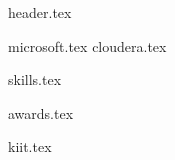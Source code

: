 \documentclass[11pt]{article}
\begin{document}
{header.tex}

{microsoft.tex}
{cloudera.tex}


{skills.tex}


{awards.tex}

{kiit.tex}
\end{document}
